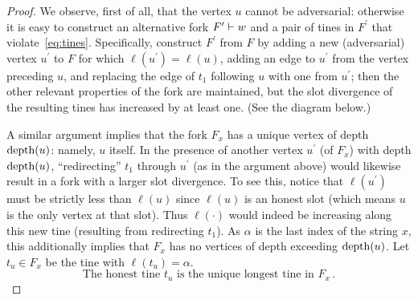 \begin{proof}
    We observe, first of all, that the vertex $u$ cannot be adversarial:
    otherwise it is easy to construct an alternative fork
    $F^\prime \vdash w$ and a pair of tines in $F^\prime$ that violate~\eqref{eq:tines}. 
    Specifically, construct $F^\prime$ from $F$ by
    adding a new (adversarial) vertex $u^\prime$ to $F$ for which
    $\ell(u^\prime) = \ell(u)$, adding an edge to $u^\prime$ from the
    vertex preceding $u$, and replacing the edge of $t_1$ following $u$
    with one from $u^\prime$; then the other relevant properties of the
    fork are maintained, but the slot divergence of the resulting tines has
    increased by at least one. (See the diagram below.)
    \begin{center}
    \end{center}
    
    A similar argument implies that the fork
    $F_x$ has a unique vertex of depth $\operatorname{depth}(u)$: namely, $u$ itself. In
    the presence of another vertex $u^\prime$ (of $F_x$) with depth
    $\operatorname{depth}(u)$, ``redirecting'' $t_1$ through $u^\prime$ (as in the
    argument above) would likewise result in a fork with 
    a larger slot divergence. 
    To see this, notice that $\ell(u^\prime)$ must be strictly less than $\ell(u)$ 
    since $\ell(u)$ is an honest slot (which means $u$ is the only vertex at that slot).
    Thus $\ell(\cdot)$ would indeed be increasing along
    this new tine (resulting from redirecting $t_1$).
    As $\alpha$ is the last index of the string $x$, this additionally
    implies that $F_x$ has no vertices of depth exceeding $\operatorname{depth}(u)$. 
    Let $t_u \in F_x$ be the tine with $\ell(t_u) = \alpha$. 
    \begin{equation}\label{eq:tu}
        \text{The honest tine $t_u$ is the unique longest tine in $F_x$}
        \,.
    \end{equation}
    

\end{proof}
